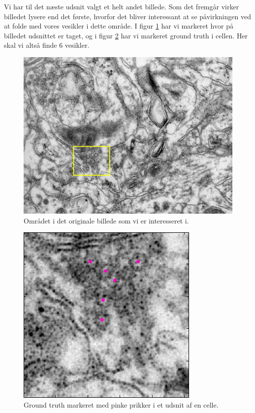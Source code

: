 Vi har til det næste udsnit valgt et helt andet billede. Som det fremgår virker billedet lysere end det første, hvorfor det bliver interessant at se påvirkningen ved at folde med vores vesikler i dette område. I figur \ref{fig:postmethod_conv_area2} har vi markeret hvor på billedet udsnittet er taget, og i figur \ref{fig:postmethod_conv_gt2} har vi markeret ground truth i cellen. Her skal vi altså finde 6 vesikler.

\begin{figure}[H]
		\centering
		\includegraphics[scale=0.5]{files/postmethod/img/area_2.png}
	\caption{Området i det originale billede som vi er interesseret i.\label{fig:postmethod_conv_area2}}
\end{figure}

\begin{figure}[H]
		\centering
		\includegraphics[scale=0.65]{files/postmethod/img/ground_truth2.png}
	\caption{Ground truth markeret med pinke prikker i et udsnit af en celle.\label{fig:postmethod_conv_gt2}}
\end{figure}

